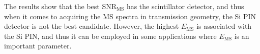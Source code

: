 The results show that the best SNR$_{\textrm{MS}}$ has the scintillator detector, and thus when it comes to acquiring the MS spectra in transmission geometry, the Si PIN detector is not the best candidate. However, the highest $E_{\textrm{MS}}$ is associated with the Si PIN, and thus it can be employed in some applications where $E_{\textrm{MS}}$ is an important parameter. 


